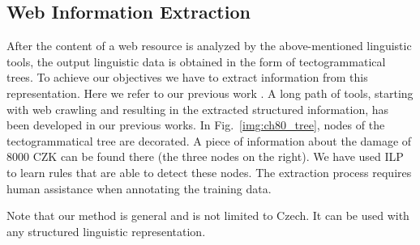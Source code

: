 \subsection{Web Information Extraction}

After the content of a web resource is analyzed by the above-mentioned linguistic tools, the output linguistic data is obtained in the form of tectogrammatical trees. To achieve our objectives we have to extract information from this representation. 
Here we refer to our previous work %
\citep{biblio:DeVoComputingaggregations2008,biblio:DeEcExperimentswith2008}.
 A long path of tools, starting with web crawling and resulting in the extracted structured information, has been developed in our previous works. 
In Fig.~\ref{img:ch80_tree}, nodes of the tectogrammatical tree are decorated. A piece of information about the damage of 8000 CZK can be found there (the three nodes on the right). We have used ILP to learn rules that are able to detect these nodes. 
The extraction process requires human assistance when annotating the training data.

Note that our method is general and is not limited to Czech. It can be used with any structured linguistic representation. 


